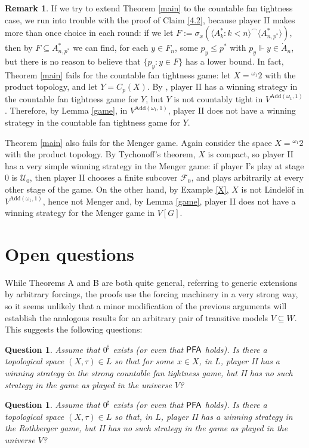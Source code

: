 \documentclass{amsart}
\newtheorem{question}[theorem]{Question}
\theoremstyle{definition}
\newtheorem{remark}[theorem]{Remark}
\newcommand{\Add}{\mathrm{Add}}
\newcommand{\PFA}{\sf PFA}
\newcommand{\seq}[1]{{\langle{#1}\rangle}}
\renewcommand{\subset}{\subseteq}
\begin{document}
\begin{remark}
If we try to extend Theorem \ref{main} to the countable fan tightness case, we run into trouble with the proof of Claim \ref{4.2}, because player II makes more than once choice in each round: if we let $F:=\sigma_x(\seq{A_k^*:k<n}^\frown \seq{A_{n,p^*}^*})$, then by $F\subset A_{n,p^*}^*$ we can find, for each $y\in F_n$, some $p_y \le p^*$ with $p_y \Vdash y\in \dot A_n$, but there is no reason to believe that $\{p_y:y\in F\}$ has a lower bound. In fact, Theorem \ref{main} fails for the countable fan tightness game: let $X={}^{\omega_1}2$ with the product topology, and let $Y=C_p(X)$. By \cite[Example 4]{scheepersRemarksCountableTightness2014}, player II has a winning strategy in the countable fan tightness game for $Y$, but $Y$ is not countably tight in $V^{\Add(\omega_1,1)}$. Therefore, by Lemma \ref{game}, in $V^{\Add(\omega_1,1)}$, player II does not have a winning strategy in the countable fan tightness game for $Y$.


Theorem \ref{main} also fails for the Menger game. Again consider the space $X={}^{\omega_1}2$ with the product topology. By Tychonoff's theorem, $X$ is compact, so player II has a very simple winning strategy in the Menger game: if player I's play at stage $0$ is $\mathcal{U}_0$, then player II chooses a finite subcover $\mathcal{F}_0$, and plays arbitrarily at every other stage of the game. On the other hand, by Example \ref{X}, $X$ is not Lindel\"of in $V^{\Add(\omega_1,1)}$, hence not Menger and, by Lemma \ref{game}, player II does not have a winning strategy for the Menger game in $V[G]$.
\end{remark}

\section{Open questions}

While Theorems A and B are both quite general, referring to generic extensions by arbitrary forcings, the proofs use the forcing machinery in a very strong way, so it seems unlikely that a minor modification of the previous arguments will establish the analogous results for an arbitrary pair of transitive models $V\subset W$. This suggests the following questions:

\begin{question}
Assume that $0^\sharp$ exists (or even that $\PFA$ holds). Is there a topological space $(X,\tau)\in L$ so that for some $x\in X$, in $L$, player II has a winning strategy in the strong countable fan tightness game, but II has no such strategy in the game as played in the universe $V$?
\end{question}

\begin{question}
Assume that $0^\sharp$ exists (or even that $\PFA$ holds). Is there a topological space $(X,\tau)\in L$ so that, in $L$, player II has a winning strategy in the Rothberger game, but II has no such strategy in the game as played in the universe $V$?
\end{question}

\printbibliography
\end{document}
